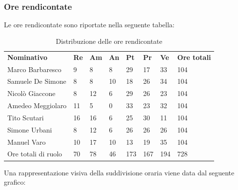     \subsubsection{Ore rendicontate}
        Le ore rendicontate sono riportate nella seguente tabella:
            \begin{center}
                \begin{table}[ht!]
                    \centering
                    \caption{Distribuzione delle ore rendicontate}
                \vspace{5px}
                    \renewcommand{\arraystretch}{1.8}
                    \begin{tabular}{p{100px} p{20px} p{20px} p{20px} p{20px} p{20px} p{20px} p{50px} }
                        \rowcolor{logo!70} \textbf{Nominativo} & \textbf{Re} & \textbf{Am} & \textbf{An} & \textbf{Pt} & \textbf{Pr} & \textbf{Ve} & \textbf{Ore totali}\\
                        Marco Barbaresco & 9 & 8 & 8 & 29 & 17 & 33 & 104\\
                        Samuele De Simone & 8 & 8 & 10 & 18 & 26 & 34 & 104\\
                        Nicolò Giaccone & 8 & 12 & 6 & 29 & 26 & 23 & 104\\
                        Amedeo Meggiolaro & 11 & 5 & 0 & 33 & 23 & 32 & 104\\
                        Tito Scutari & 16 & 16 & 6 & 25 & 30 & 11 & 104\\
                        Simone Urbani & 8 & 12 & 6 & 26 & 26 & 26 & 104\\
                        Manuel Varo & 10 & 17 & 10 & 13 & 19 & 35 & 104\\
                        Ore totali di ruolo & 70 & 78 & 46 & 173 & 167 & 194 & 728\\
                    \end{tabular}
                \end{table}
            \end{center}
            \pagebreak
            Una rappresentazione visiva della suddivisione oraria viene data dal seguente grafico:
